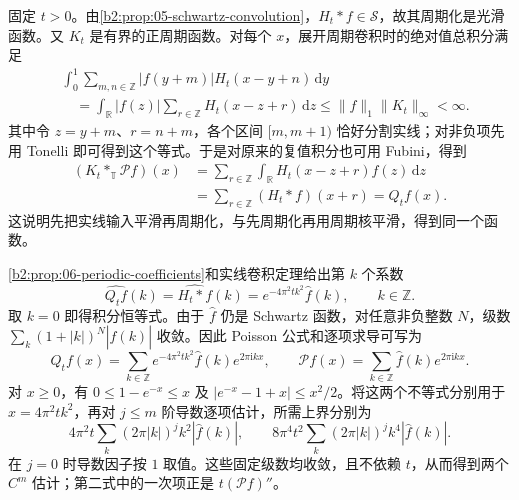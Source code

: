 \begin{solution}
固定 \(t>0\)。由\cref{b2:prop:05-schwartz-convolution}，\(H_t*f\in\mathcal S\)，故其周期化是光滑函数。又 \(K_t\) 是有界的正周期函数。对每个 \(x\)，展开周期卷积时的绝对值总积分满足
\[
 \begin{aligned}
 &\int_0^1\sum_{m,n\in\mathbb Z}|f(y+m)|H_t(x-y+n)\,\mathrm dy\\
 &\quad=\int_{\mathbb R}|f(z)|\sum_{r\in\mathbb Z}H_t(x-z+r)\,\mathrm dz
 \leq\|f\|_1\|K_t\|_\infty<\infty.
 \end{aligned}
\]
其中令 \(z=y+m\)、\(r=n+m\)，各个区间 \([m,m+1)\) 恰好分割实线；对非负项先用 Tonelli 即可得到这个等式。于是对原来的复值积分也可用 Fubini，得到
\[
 \begin{aligned}
 (K_t*_{\mathbb T}\mathcal Pf)(x)
 &=\sum_{r\in\mathbb Z}\int_{\mathbb R}H_t(x-z+r)f(z)\,\mathrm dz\\
 &=\sum_{r\in\mathbb Z}(H_t*f)(x+r)=Q_tf(x).
 \end{aligned}
\]
这说明先把实线输入平滑再周期化，与先周期化再用周期核平滑，得到同一个函数。

\cref{b2:prop:06-periodic-coefficients}和实线卷积定理给出第 \(k\) 个系数
\[
 \widehat{Q_tf}(k)=\widehat{H_t*f}(k)
 =e^{-4\pi^2tk^2}\widehat f(k),\qquad k\in\mathbb Z.
\]
取 \(k=0\) 即得积分恒等式。由于 \(\widehat f\) 仍是 Schwartz 函数，对任意非负整数 \(N\)，级数 \(\sum_k(1+|k|)^N|\widehat f(k)|\) 收敛。因此 Poisson 公式和逐项求导可写为
\[
 Q_tf(x)=\sum_{k\in\mathbb Z}e^{-4\pi^2tk^2}\widehat f(k)e^{2\pi\mathrm ikx},
 \qquad
 \mathcal Pf(x)=\sum_{k\in\mathbb Z}\widehat f(k)e^{2\pi\mathrm ikx}.
\]
对 \(x\geq0\)，有 \(0\leq1-e^{-x}\leq x\) 及 \(|e^{-x}-1+x|\leq x^2/2\)。将这两个不等式分别用于 \(x=4\pi^2tk^2\)，再对 \(j\leq m\) 阶导数逐项估计，所需上界分别为
\[
 4\pi^2t\sum_k(2\pi|k|)^j k^2|\widehat f(k)|,
 \qquad
 8\pi^4t^2\sum_k(2\pi|k|)^j k^4|\widehat f(k)|.
\]
在 \(j=0\) 时导数因子按 \(1\) 取值。这些固定级数均收敛，且不依赖 \(t\)，从而得到两个 \(C^m\) 估计；第二式中的一次项正是 \(t(\mathcal Pf)''\)。
\end{solution}
